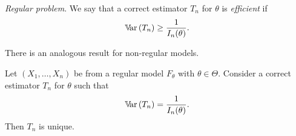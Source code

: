 \documentclass[12pt]{report}
\begin{document}
\begin{definition}
	\emph{Regular problem}. We say that a correct estimator $T_{n}$ for $\theta$ is \emph{efficient} if
	\begin{equation*}
		\mathbb{V}\!\mathrm{ar}\,(T_{n})\geq\frac{1}{I_{n}(\theta)}.
	\end{equation*}
\end{definition}
There is an analogous result for non-regular models.
\begin{proposition}
	Let $(X_{1},\ldots,X_{n})$ be from a regular model $F_{\theta}$ with $\theta\in\Theta$. Consider a correct estimator $T_{n}$ for $\theta$ such that 
	\begin{equation*}
		\mathbb{V}\!\mathrm{ar}\,(T_{n})=\frac{1}{I_{n}(\theta)}.
	\end{equation*}
	Then $T_{n}$ is unique.
\end{proposition}
\end{document}

